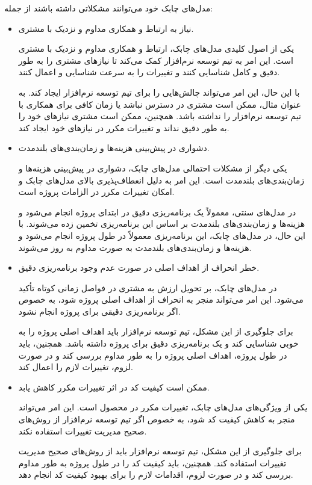 مدل‌های چابک خود می‌توانند مشکلاتی داشته باشند از جمله:
\begin{itemize}
	\item نیاز به ارتباط و همکاری مداوم و نزدیک با مشتری.
	
	یکی از اصول کلیدی مدل‌های چابک، ارتباط و همکاری مداوم و نزدیک با مشتری است. این امر به تیم توسعه نرم‌افزار کمک می‌کند تا نیازهای مشتری را به طور دقیق و کامل شناسایی کنند و تغییرات را به سرعت شناسایی و اعمال کنند.
	
	با این حال، این امر می‌تواند چالش‌هایی را برای تیم توسعه نرم‌افزار ایجاد کند. به عنوان مثال، ممکن است مشتری در دسترس نباشد یا زمان کافی برای همکاری با تیم توسعه نرم‌افزار را نداشته باشد. همچنین، ممکن است مشتری نیازهای خود را به طور دقیق نداند و تغییرات مکرر در نیازهای خود ایجاد کند.
	
	\item دشواری در پیش‌بینی هزینه‌ها و زمان‌بندی‌های بلندمدت.
	
	یکی دیگر از مشکلات احتمالی مدل‌های چابک، دشواری در پیش‌بینی هزینه‌ها و زمان‌بندی‌های بلندمدت است. این امر به دلیل انعطاف‌پذیری بالای مدل‌های چابک و امکان تغییرات مکرر در الزامات پروژه است.
	
	در مدل‌های سنتی، معمولاً یک برنامه‌ریزی دقیق در ابتدای پروژه انجام می‌شود و هزینه‌ها و زمان‌بندی‌های بلندمدت بر اساس این برنامه‌ریزی تخمین زده می‌شوند. با این حال، در مدل‌های چابک، این برنامه‌ریزی معمولاً در طول پروژه انجام می‌شود و هزینه‌ها و زمان‌بندی‌های بلندمدت به صورت مداوم به روز می‌شوند.
	
	\item خطر انحراف از اهداف اصلی در صورت عدم وجود برنامه‌ریزی دقیق.
	
	در مدل‌های چابک، بر تحویل ارزش به مشتری در فواصل زمانی کوتاه تأکید می‌شود. این امر می‌تواند منجر به انحراف از اهداف اصلی پروژه شود، به خصوص اگر برنامه‌ریزی دقیقی برای پروژه انجام نشود.
	
	برای جلوگیری از این مشکل، تیم توسعه نرم‌افزار باید اهداف اصلی پروژه را به خوبی شناسایی کند و یک برنامه‌ریزی دقیق برای پروژه داشته باشد. همچنین، باید در طول پروژه، اهداف اصلی پروژه را به طور مداوم بررسی کند و در صورت لزوم، تغییرات لازم را اعمال کند.
	
	\item ممکن است کیفیت کد در اثر تغییرات مکرر کاهش یابد.
	
	یکی از ویژگی‌های مدل‌های چابک، تغییرات مکرر در محصول است. این امر می‌تواند منجر به کاهش کیفیت کد شود، به خصوص اگر تیم توسعه نرم‌افزار از روش‌های صحیح مدیریت تغییرات استفاده نکند.
	
	برای جلوگیری از این مشکل، تیم توسعه نرم‌افزار باید از روش‌های صحیح مدیریت تغییرات استفاده کند. همچنین، باید کیفیت کد را در طول پروژه به طور مداوم بررسی کند و در صورت لزوم، اقدامات لازم را برای بهبود کیفیت کد انجام دهد.
	
\end{itemize}

